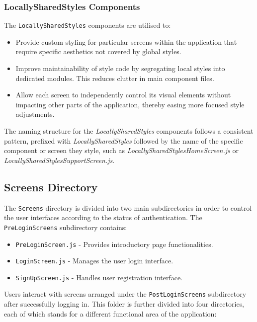 \subsubsection{LocallySharedStyles Components}

The \texttt{LocallySharedStyles} components are utilised to:
\begin{itemize}
    \item Provide custom styling for particular screens within the application that require specific aesthetics not covered by global styles.
    \item Improve maintainability of style code by segregating local styles into dedicated modules. This reduces clutter in main component files.
    \item Allow each screen to independently control its visual elements without impacting other parts of the application, thereby easing more focused style adjustments.
\end{itemize}

The naming structure for the \textit{LocallySharedStyles} components follows a consistent pattern, prefixed with \textit{LocallySharedStyles} followed by the name of the specific component or screen they style, such as \textit{LocallySharedStylesHomeScreen.js} or \textit{LocallySharedStylesSupportScreen.js}. 

\subsection{Screens Directory}

The \texttt{Screens} directory is divided into two main subdirectories in order to control the user interfaces according to the status of authentication. The \texttt{PreLoginScreens} subdirectory contains:

\begin{itemize}
    \item \texttt{PreLoginScreen.js} - Provides introductory page functionalities.
    \item \texttt{LoginScreen.js} - Manages the user login interface.
    \item \texttt{SignUpScreen.js} - Handles user registration interface.
\end{itemize}

Users interact with screens arranged under the \texttt{PostLoginScreens} subdirectory after successfully logging in. This folder is further divided into four directories, each of which stands for a different functional area of the application:

